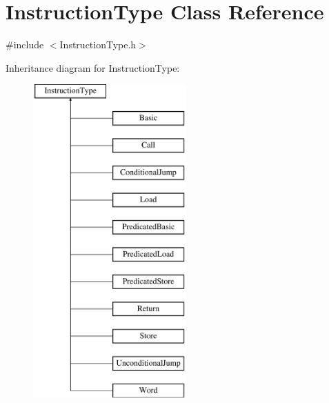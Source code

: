 \hypertarget{classInstructionType}{}\section{Instruction\+Type Class Reference}
\label{classInstructionType}


{\ttfamily \#include $<$Instruction\+Type.\+h$>$}

Inheritance diagram for Instruction\+Type\+:\begin{figure}[H]
\begin{center}
\leavevmode
\includegraphics[height=12.000000cm]{classInstructionType}
\end{center}
\end{figure}
